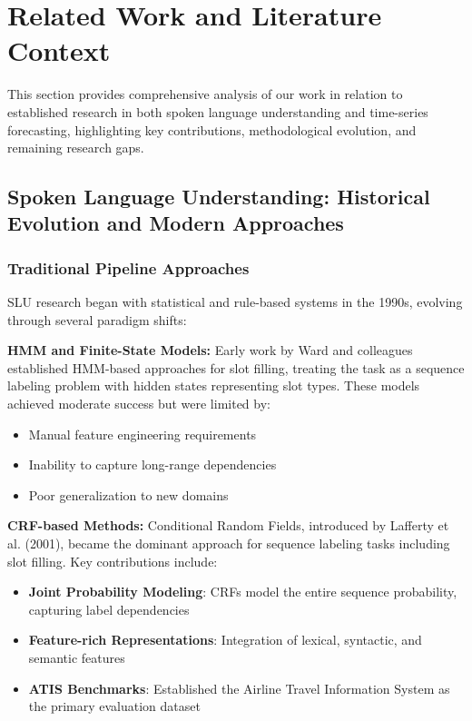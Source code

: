\documentclass[conference]{IEEEtran}
\begin{document}
\section{Related Work and Literature Context}

This section provides comprehensive analysis of our work in relation to established research in both spoken language understanding and time-series forecasting, highlighting key contributions, methodological evolution, and remaining research gaps.

\subsection{Spoken Language Understanding: Historical Evolution and Modern Approaches}

\subsubsection{Traditional Pipeline Approaches}
SLU research began with statistical and rule-based systems in the 1990s, evolving through several paradigm shifts:

\textbf{HMM and Finite-State Models:}
Early work by Ward and colleagues established HMM-based approaches for slot filling, treating the task as a sequence labeling problem with hidden states representing slot types. These models achieved moderate success but were limited by:
\begin{itemize}
  \item Manual feature engineering requirements
  \item Inability to capture long-range dependencies
  \item Poor generalization to new domains
\end{itemize}

\textbf{CRF-based Methods:}
Conditional Random Fields, introduced by Lafferty et al. (2001), became the dominant approach for sequence labeling tasks including slot filling. Key contributions include:
\begin{itemize}
  \item \textbf{Joint Probability Modeling}: CRFs model the entire sequence probability, capturing label dependencies
  \item \textbf{Feature-rich Representations}: Integration of lexical, syntactic, and semantic features
  \item \textbf{ATIS Benchmarks}: Established the Airline Travel Information System as the primary evaluation dataset
\end{itemize}
\end{document}
